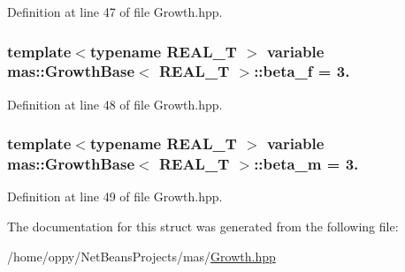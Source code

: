 Definition at line 47 of file Growth.\-hpp.

\hypertarget{structmas_1_1_growth_base_ab24d4baacfb805e7b48db9b74e332658}{
\subsubsection[{beta\-\_\-f}]{\setlength{\rightskip}{0pt plus 5cm}template$<$typename R\-E\-A\-L\-\_\-\-T $>$ {\bf variable} {\bf mas\-::\-Growth\-Base}$<$ R\-E\-A\-L\-\_\-\-T $>$\-::beta\-\_\-f = 3.}}\label{structmas_1_1_growth_base_ab24d4baacfb805e7b48db9b74e332658}


Definition at line 48 of file Growth.\-hpp.

\hypertarget{structmas_1_1_growth_base_a17b3c2eef24ac82f2feb94119eb4ae64}{
\subsubsection[{beta\-\_\-m}]{\setlength{\rightskip}{0pt plus 5cm}template$<$typename R\-E\-A\-L\-\_\-\-T $>$ {\bf variable} {\bf mas\-::\-Growth\-Base}$<$ R\-E\-A\-L\-\_\-\-T $>$\-::beta\-\_\-m = 3.}}\label{structmas_1_1_growth_base_a17b3c2eef24ac82f2feb94119eb4ae64}


Definition at line 49 of file Growth.\-hpp.



The documentation for this struct was generated from the following file\-:\begin{DoxyCompactItemize}
\item 
/home/oppy/\-Net\-Beans\-Projects/mas/\hyperlink{_growth_8hpp}{Growth.\-hpp}\end{DoxyCompactItemize}
